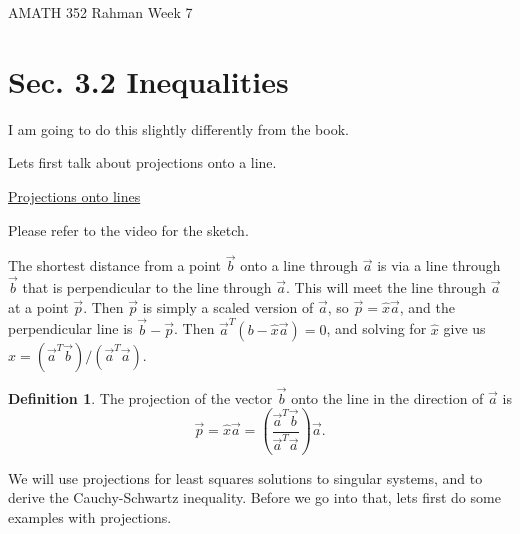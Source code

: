 \documentclass[reqno]{amsart}
\theoremstyle{definition}
\newtheorem{definition}{Definition}
\begin{document}
\begin{flushleft}
{\sc \Large AMATH 352 Rahman} \hfill Week 7
\bigskip
\end{flushleft}

\newcommand{\R}{\mathbb{R}}
\newcommand{\N}{\mathbb{N}}
\newcommand{\Z}{\mathbb{Z}}
\newcommand{\Q}{\mathbb{Q}}
\renewcommand{\CancelColor}{\color{red}}
\newcommand{\?}{\stackrel{?}{=}}
\renewcommand{\varphi}{\phi}
\newcommand{\card}{\text{Card}}
\newcommand{\bigzero}{\text{\Huge 0}}
\newcommand{\curvearrowdown}{{\color{red}\rotatebox{90}{$\curvearrowleft$}}}
\newcommand{\curvearrowup}{{\color{red}\rotatebox{90}{$\curvearrowright$}}}

\newcommand*\circled[1]{\color{red}\tikz[baseline=(char.base)]{
            \node[shape=circle,draw,inner sep=2pt] (char) {#1};}}



\section*{Sec. 3.2 Inequalities}

{\color{blue} I am going to do this slightly differently from the book.}

Lets first talk about projections onto a line.

\bigskip

\underline{Projections onto lines}

Please refer to the video for the sketch.

The shortest distance from a point $\vec{b}$ onto a line through $\vec{a}$ is via a line through $\vec{b}$
that is perpendicular to the line through $\vec{a}$.  This will meet the line through $\vec{a}$ at a point
$\vec{p}$.  Then $\vec{p}$ is simply a scaled version of $\vec{a}$, so $\vec{p} = \hat{x}\vec{a}$,
and the perpendicular line is $\vec{b} - \vec{p}$.  Then $\vec{a}^T(b - \hat{x}\vec{a}) = 0$, and solving
for $\hat{x}$ give us $\hat{x} = (\vec{a}^T\vec{b})/(\vec{a}^T\vec{a})$.

\begin{definition}
The projection of the vector $\vec{b}$ onto the line in the direction of $\vec{a}$ is 
%
\begin{equation}
\vec{p} = \hat{x}\vec{a} = \left(\frac{\vec{a}^T\vec{b}}{\vec{a}^T\vec{a}}\right)\vec{a}.
\end{equation}
\end{definition}

We will use projections for least squares solutions to singular systems, and to derive
the Cauchy-Schwartz inequality.  Before we go into that, lets first do some examples with projections.
\end{document}
